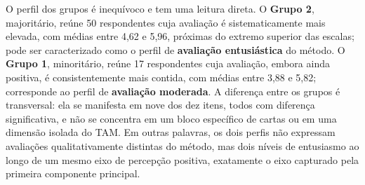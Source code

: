 \begin{table}[h!]
\centering
\captionsetup{width=15cm}
\caption{Perfil dos grupos identificados pela segmentação k-means}
\label{tab:perfil-clusters}
\end{table}

\FloatBarrier

O perfil dos grupos é inequívoco e tem uma leitura direta. O \textbf{Grupo 2}, majoritário, reúne 50 respondentes cuja avaliação é sistematicamente mais elevada, com médias entre 4,62 e 5,96, próximas do extremo superior das escalas; pode ser caracterizado como o perfil de \textbf{avaliação entusiástica} do método. O \textbf{Grupo 1}, minoritário, reúne 17 respondentes cuja avaliação, embora ainda positiva, é consistentemente mais contida, com médias entre 3,88 e 5,82; corresponde ao perfil de \textbf{avaliação moderada}. A diferença entre os grupos é transversal: ela se manifesta em nove dos dez itens, todos com diferença significativa, e não se concentra em um bloco específico de cartas ou em uma dimensão isolada do TAM. Em outras palavras, os dois perfis não expressam avaliações qualitativamente distintas do método, mas dois níveis de entusiasmo ao longo de um mesmo eixo de percepção positiva, exatamente o eixo capturado pela primeira componente principal.

